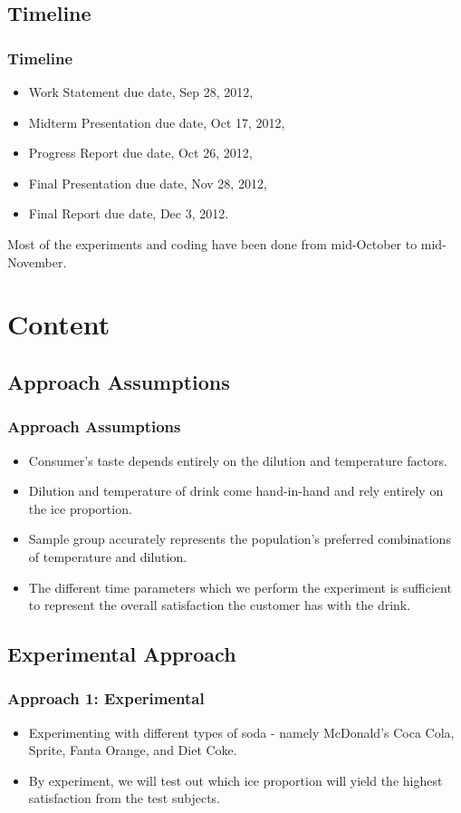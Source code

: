 \documentclass[compress,handout,10pt]{beamer}
\let\olditem\item
\renewcommand{\item}{\setlength{\itemsep}{0.5\baselineskip}\olditem}
\begin{document}
\subsection{Timeline}
\begin{frame}
    \frametitle{Timeline}
\begin{itemize}
    \item Work Statement due date, Sep 28, 2012,
    \item Midterm Presentation due date, Oct 17, 2012,
    \item Progress Report due date, Oct 26, 2012,
    \item Final Presentation due date, Nov 28, 2012,
    \item Final Report due date, Dec 3, 2012.
\end{itemize}
\vspace{6pt} Most of the experiments and coding have been done from mid-October to mid-November.
\end{frame}

\section{Content}
\subsection{Approach Assumptions}
\begin{frame}
    \frametitle{Approach Assumptions}

\begin {itemize}
\item Consumer's taste depends entirely on the dilution and temperature factors.
\item Dilution and temperature of drink come hand-in-hand and rely entirely on the ice proportion.
\item Sample group accurately represents the population's preferred combinations of temperature and dilution.
\item The different time parameters which we perform the experiment is sufficient to represent the overall satisfaction the customer has with the drink.
\end{itemize}
\end{frame}

\subsection{Experimental Approach}
\begin{frame}
    \frametitle{Approach 1: Experimental}

\begin {itemize}
\item Experimenting with different types of soda - namely  McDonald's Coca Cola, Sprite, Fanta Orange, and Diet Coke.
\item By experiment, we will test out which ice proportion will yield the highest satisfaction from the test subjects.
\end{itemize}

\end{frame}
\end{document}
